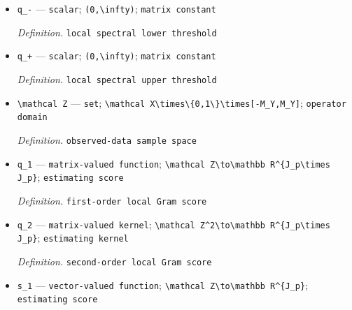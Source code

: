 \documentclass{article}
\begin{document}
\begin{itemize}
  \par\smallskip\noindent\emph{Definition.} \texttt{spectrally stabilized spline Gram matrix}
  \item \texttt{q\_\allowbreak{}-\allowbreak{}} --- \texttt{scalar}; \texttt{(0,\allowbreak{}\textbackslash{}\allowbreak{}infty)}; \texttt{matrix constant}
  \par\smallskip\noindent\emph{Definition.} \texttt{local spectral lower threshold}
  \item \texttt{q\_\allowbreak{}+\allowbreak{}} --- \texttt{scalar}; \texttt{(0,\allowbreak{}\textbackslash{}\allowbreak{}infty)}; \texttt{matrix constant}
  \par\smallskip\noindent\emph{Definition.} \texttt{local spectral upper threshold}
  \item \texttt{\textbackslash{}\allowbreak{}mathcal Z} --- \texttt{set}; \texttt{\textbackslash{}\allowbreak{}mathcal X\textbackslash{}\allowbreak{}times\textbackslash{}\allowbreak{}\{0,\allowbreak{}1\textbackslash{}\allowbreak{}\}\allowbreak{}\textbackslash{}\allowbreak{}times[-\allowbreak{}M\_\allowbreak{}Y,\allowbreak{}M\_\allowbreak{}Y]}; \texttt{operator domain}
  \par\smallskip\noindent\emph{Definition.} \texttt{observed-\allowbreak{}data sample space}
  \item \texttt{q\_\allowbreak{}1} --- \texttt{matrix-\allowbreak{}valued function}; \texttt{\textbackslash{}\allowbreak{}mathcal Z\textbackslash{}\allowbreak{}to\textbackslash{}\allowbreak{}mathbb R\textasciicircum{}\{J\_\allowbreak{}p\textbackslash{}\allowbreak{}times J\_\allowbreak{}p\}\allowbreak{}}; \texttt{estimating score}
  \par\smallskip\noindent\emph{Definition.} \texttt{first-\allowbreak{}order local Gram score}
  \item \texttt{q\_\allowbreak{}2} --- \texttt{matrix-\allowbreak{}valued kernel}; \texttt{\textbackslash{}\allowbreak{}mathcal Z\textasciicircum{}2\textbackslash{}\allowbreak{}to\textbackslash{}\allowbreak{}mathbb R\textasciicircum{}\{J\_\allowbreak{}p\textbackslash{}\allowbreak{}times J\_\allowbreak{}p\}\allowbreak{}}; \texttt{estimating kernel}
  \par\smallskip\noindent\emph{Definition.} \texttt{second-\allowbreak{}order local Gram score}
  \item \texttt{s\_\allowbreak{}1} --- \texttt{vector-\allowbreak{}valued function}; \texttt{\textbackslash{}\allowbreak{}mathcal Z\textbackslash{}\allowbreak{}to\textbackslash{}\allowbreak{}mathbb R\textasciicircum{}\{J\_\allowbreak{}p\}\allowbreak{}}; \texttt{estimating score}

\end{itemize}
\end{document}
